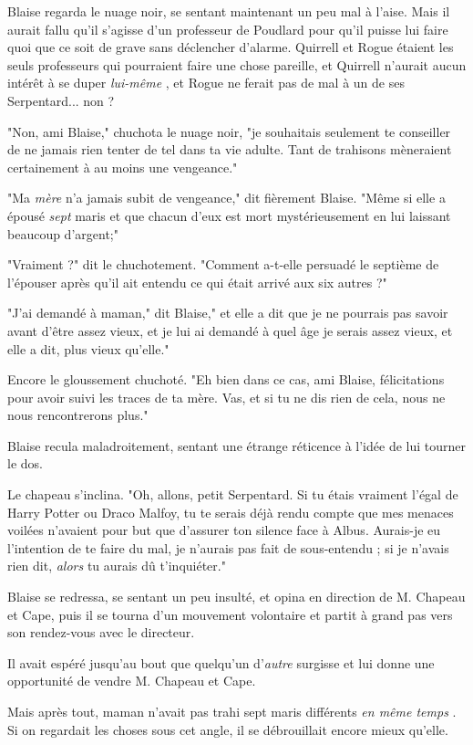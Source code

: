 Blaise regarda le nuage noir, se sentant maintenant un peu mal à l'aise. Mais il aurait fallu qu'il s'agisse d'un professeur de Poudlard pour qu'il puisse lui faire quoi que ce soit de grave sans déclencher d'alarme. Quirrell et Rogue étaient les seuls professeurs qui pourraient faire une chose pareille, et Quirrell n'aurait aucun intérêt à se duper \emph{lui-même} , et Rogue ne ferait pas de mal à un de ses Serpentard... non ?

"Non, ami Blaise," chuchota le nuage noir, "je souhaitais seulement te conseiller de ne jamais rien tenter de tel dans ta vie adulte. Tant de trahisons mèneraient certainement à au moins une vengeance."

"Ma \emph{mère}  n'a jamais subit de vengeance," dit fièrement Blaise. "Même si elle a épousé \emph{sept}  maris et que chacun d'eux est mort mystérieusement en lui laissant beaucoup d'argent;"

"Vraiment ?" dit le chuchotement. "Comment a-t-elle persuadé le septième de l'épouser après qu'il ait entendu ce qui était arrivé aux six autres ?"

"J'ai demandé à maman," dit Blaise," et elle a dit que je ne pourrais pas savoir avant d'être assez vieux, et je lui ai demandé à quel âge je serais assez vieux, et elle a dit, plus vieux qu'elle."

Encore le gloussement chuchoté. "Eh bien dans ce cas, ami Blaise, félicitations pour avoir suivi les traces de ta mère. Vas, et si tu ne dis rien de cela, nous ne nous rencontrerons plus."

Blaise recula maladroitement, sentant une étrange réticence à l'idée de lui tourner le dos.

Le chapeau s'inclina. "Oh, allons, petit Serpentard. Si tu étais vraiment l'égal de Harry Potter ou Draco Malfoy, tu te serais déjà rendu compte que mes menaces voilées n'avaient pour but que d'assurer ton silence face à Albus. Aurais-je eu l'intention de te faire du mal, je n'aurais pas fait de sous-entendu ; si je n'avais rien dit, \emph{alors}  tu aurais dû t'inquiéter."

Blaise se redressa, se sentant un peu insulté, et opina en direction de M. Chapeau et Cape, puis il se tourna d'un mouvement volontaire et partit à grand pas vers son rendez-vous avec le directeur.

Il avait espéré jusqu'au bout que quelqu'un d'\emph{autre}  surgisse et lui donne une opportunité de vendre M. Chapeau et Cape.

Mais après tout, maman n'avait pas trahi sept maris différents \emph{en même temps} . Si on regardait les choses sous cet angle, il se débrouillait encore mieux qu'elle.

